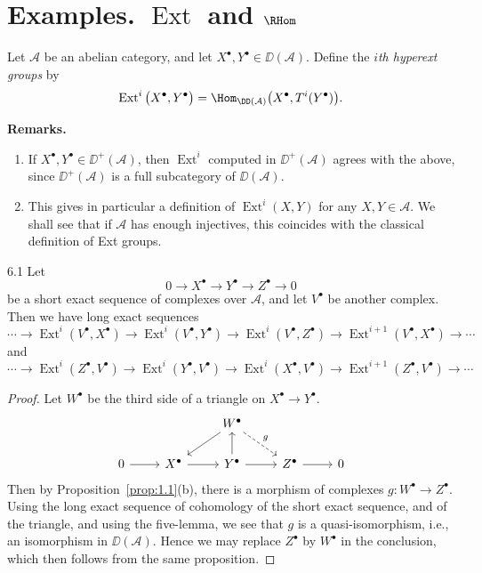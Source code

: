 \section{Examples. $\operatorname{Ext}$ and $\RHom$}\label{sec:1.6}

\begin{definition*}
Let $\mathcal{A}$ be an abelian category, and let $X^\bullet,Y^\bullet\in\DD(\mathcal{A})$.
Define the \emph{$i$th hyperext groups} by
\[
\operatorname{Ext}^i\big(X^\bullet,Y^\bullet\big)
= \Hom_{\DD(\mathcal{A})}\big(X^\bullet, T^i(Y^\bullet)\big).
\]
\end{definition*}

\textbf{Remarks.}
\begin{enumerate}
\item If $X^\bullet,Y^\bullet\in\DD^+(\mathcal{A})$, then $\operatorname{Ext}^i$ computed in $\DD^+(\mathcal{A})$
agrees with the above, since $\DD^+(\mathcal{A})$ is a full subcategory of $\DD(\mathcal{A})$.

\item This gives in particular a definition of  $\operatorname{Ext}^i(X,Y)$ for any $X,Y\in\mathcal{A}$.
We shall see that if $\mathcal{A}$ has enough injectives, this coincides with the classical
definition of Ext groups.
\end{enumerate}

\begin{bookproposition}{6.1}\label{prop:1.6.1}
Let
\[
0 \to X^\bullet \to Y^\bullet \to Z^\bullet \to 0
\]
be a short exact sequence of complexes over $\mathcal{A}$, and let $V^\bullet$ be another complex.
Then we have long exact sequences
\[
\cdots \to \operatorname{Ext}^i(V^\bullet,X^\bullet)
\to \operatorname{Ext}^i(V^\bullet,Y^\bullet)
\to \operatorname{Ext}^i(V^\bullet,Z^\bullet)
\to \operatorname{Ext}^{i+1}(V^\bullet,X^\bullet)
\to \cdots
\]
and
\[
\cdots \to \operatorname{Ext}^i(Z^\bullet,V^\bullet)
\to \operatorname{Ext}^i(Y^\bullet,V^\bullet)
\to \operatorname{Ext}^i(X^\bullet,V^\bullet)
\to \operatorname{Ext}^{i+1}(Z^\bullet,V^\bullet)
\to \cdots
\]
\end{bookproposition}

\begin{proof}
Let $W^\bullet$ be the third side of a triangle on $X^\bullet \to Y^\bullet$.
\[
\begin{tikzcd}
	& & W^\bullet \arrow[ld] \arrow[rd, dashed, "g"] & \\
	0 \arrow[r] & X^\bullet \arrow[r] & Y^\bullet \arrow[u] \arrow[r] & Z^\bullet \arrow[r] & 0
\end{tikzcd}
\]
Then by Proposition~\ref{prop:1.1}(b), there is a morphism of complexes $g\colon W^\bullet \to Z^\bullet$. Using the long exact sequence of cohomology of the short exact sequence, and of the triangle, and using the five-lemma, we see that $g$ is a quasi-isomorphism, i.e., an isomorphism in $\DD(\mathcal{A})$. Hence we may replace $Z^\bullet$ by $W^\bullet$ in the conclusion, which then follows from the same proposition.
\end{proof}

